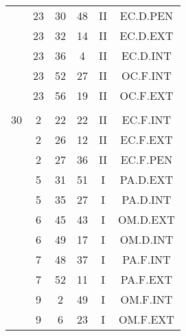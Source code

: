 \documentclass[12pt, a4paper]{article}
\begin{document}
\begin{multicols}{3}
{\begin{tabular}{c c c c c c}
	 	 	 	 & 23 & 30 & 48 & II & EC.D.PEN\\%
	 	 	 	 & 23 & 32 & 14 & II & EC.D.EXT\\%
	 	 	 	 & 23 & 36 & 4 & II & EC.D.INT\\%
	 	 	 	 & 23 & 52 & 27 & II & OC.F.INT\\%
	 	 	 	 & 23 & 56 & 19 & II & OC.F.EXT\\%
	 	 	 	 & & & & & \\%
	 	 	 	30 & 2 & 22 & 22 & II & EC.F.INT\\%
	 	 	 	 & 2 & 26 & 12 & II & EC.F.EXT\\%
	 	 	 	 & 2 & 27 & 36 & II & EC.F.PEN\\%
	 	 	 	 & 5 & 31 & 51 & I & PA.D.EXT\\%
	 	 	 	 & 5 & 35 & 27 & I & PA.D.INT\\%
	 	 	 	 & 6 & 45 & 43 & I & OM.D.EXT\\%
	 	 	 	 & 6 & 49 & 17 & I & OM.D.INT\\%
	 	 	 	 & 7 & 48 & 37 & I & PA.F.INT\\%
	 	 	 	 & 7 & 52 & 11 & I & PA.F.EXT\\%
	 	 	 	 & 9 & 2 & 49 & I & OM.F.INT\\%
	 	 	 	 & 9 & 6 & 23 & I & OM.F.EXT\\%
	 	 \end{tabular}
 	}
\end{multicols}
\end{document}
